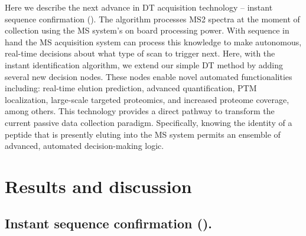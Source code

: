 Here we describe the next advance in DT acquisition technology -- instant sequence confirmation (\inseq{}). The \inseq{} algorithm processes MS2 spectra at the moment of collection using the MS system's on board processing power. With sequence in hand the MS acquisition system can process this knowledge to make autonomous, real-time decisions about what type of scan to trigger next. Here, with the \inseq{} instant identification algorithm, we extend our simple DT method by adding several new decision nodes. These nodes enable novel automated functionalities including: real-time elution prediction, advanced quantification, PTM localization, large-scale targeted proteomics, and increased proteome coverage, among others. This technology provides a direct pathway to transform the current passive data collection paradigm. Specifically, knowing the identity of a peptide that is presently eluting into the MS system permits an ensemble of advanced, automated decision-making logic.

\section{Results and discussion}

\subsection*{Instant sequence confirmation (\inseq{}).}

